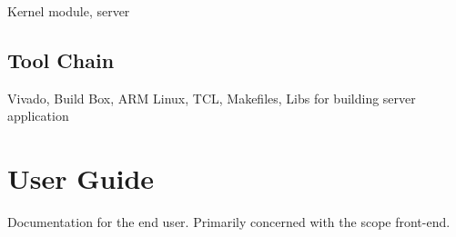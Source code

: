 \documentclass[a4paper,oneside]{alpenthesis/alpenthesis}
\begin{document}
Kernel module, server


\chapter{Tool Chain} %
\label{ch:Tool_Chain}
Vivado, Build Box, ARM Linux, TCL, Makefiles, Libs for building server application



\part{User Guide} %
\label{part:User_Guide}
Documentation for the end user. Primarily concerned with the scope front-end.

\end{document}
